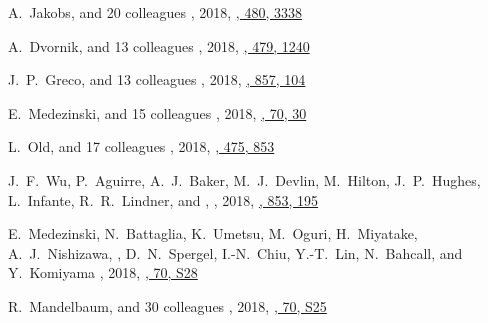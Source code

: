 \begin{etaremune}
\item
A.~Jakobs, and 20 colleagues
,
2018, \href{https://ui.adsabs.harvard.edu/abs/2018MNRAS.480.3338J}{\mnras, 480, 3338}

\item
A.~Dvornik, and 13 colleagues
,
2018, \href{https://ui.adsabs.harvard.edu/abs/2018MNRAS.479.1240D}{\mnras, 479, 1240}

\item
J.~P.~Greco, and 13 colleagues
,
2018, \href{https://ui.adsabs.harvard.edu/abs/2018ApJ...857..104G}{\apj, 857, 104}

\item
E.~Medezinski, and 15 colleagues
,
2018, \href{https://ui.adsabs.harvard.edu/abs/2018PASJ...70...30M}{\pasj, 70, 30}

\item
L.~Old, and 17 colleagues
,
2018, \href{https://ui.adsabs.harvard.edu/abs/2018MNRAS.475..853O}{\mnras, 475, 853}

\item
J.~F.~Wu, P.~Aguirre, A.~J.~Baker, M.~J.~Devlin, M.~Hilton, J.~P.~Hughes, L.~Infante, R.~R.~Lindner, and \myself,
,
2018, \href{https://ui.adsabs.harvard.edu/abs/2018ApJ...853..195W}{\apj, 853, 195}

\item
E.~Medezinski, N.~Battaglia, K.~Umetsu, M.~Oguri, H.~Miyatake, A.~J.~Nishizawa, \myself, D.~N.~Spergel, I.-N.~Chiu, Y.-T.~Lin, N.~Bahcall, and Y.~Komiyama
,
2018, \href{https://ui.adsabs.harvard.edu/abs/2018PASJ...70S..28M}{\pasj, 70, S28}

\item
R.~Mandelbaum, and 30 colleagues
,
2018, \href{https://ui.adsabs.harvard.edu/abs/2018PASJ...70S..25M}{\pasj, 70, S25}


\end{etaremune}
